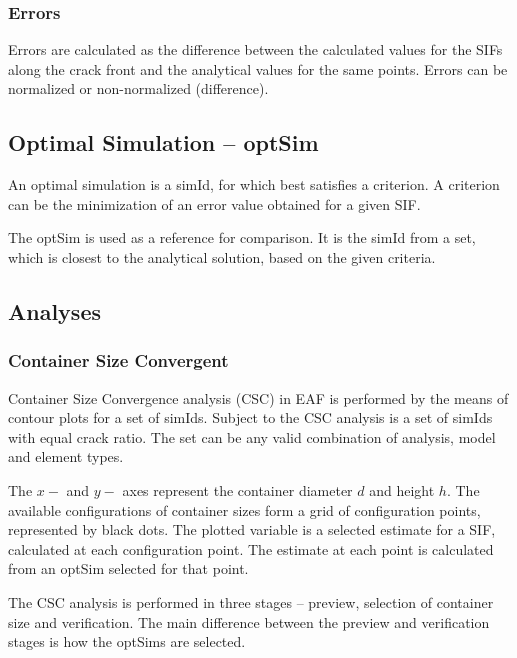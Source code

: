 \documentclass[10pt,a4paper]{article}
\begin{document}
\subsubsection{Errors}

Errors are calculated as the difference between the calculated values for the SIFs along the crack front and the analytical values for the same points. Errors can be normalized or non-normalized (difference).



\subsection{Optimal Simulation -- optSim}

An optimal simulation is a simId, for which best satisfies a criterion. A criterion can be the minimization of an error value obtained for a given SIF.

The optSim is used as a reference for comparison. It is the simId from a set, which is closest to the analytical solution, based on the given criteria.






\subsection{Analyses}


\subsubsection{Container Size Convergent}

Container Size Convergence analysis (CSC) in EAF is performed by the means of contour plots for a set of simIds.
Subject to the CSC analysis is a set of simIds with equal crack ratio. The set can be any valid combination of analysis, model and element types.

The $x-$ and $y-$ axes represent the container diameter $d$ and height $h$. The available configurations of container sizes form a grid of configuration points, represented by black dots. The plotted variable is a selected estimate for a SIF, calculated at each configuration point. The estimate at each point is calculated from an optSim selected for that point.

The CSC analysis is performed in three stages -- preview, selection of container size and verification. The main difference between the preview and verification stages is how the optSims are selected.
\end{document}
